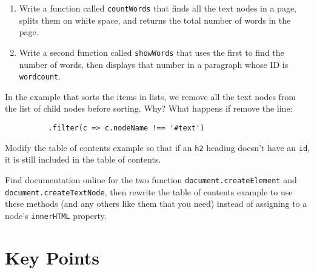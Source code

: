 
\begin{enumerate}
\item
  Write a function called \texttt{countWords} that finds all the text nodes in a page,
  splits them on white space,
  and returns the total number of words in the page.
\item
  Write a second function called \texttt{showWords} that uses the first to find the number of words,
  then displays that number in a paragraph whose ID is \texttt{wordcount}.
\end{enumerate}


In the example that sorts the items in lists,
we remove all the text nodes from the list of child nodes before sorting.
Why?
What happens if remove the line:

\begin{verbatim}
          .filter(c => c.nodeName !== '#text')
\end{verbatim}


Modify the table of contents example so that if an \texttt{h2} heading doesn't have an \texttt{id},
it is still included in the table of contents.


Find documentation online for the two function
\texttt{document.createElement} and \texttt{document.createTextNode},
then rewrite the table of contents example to use these methods
(and any others like them that you need)
instead of assigning to a node's \texttt{innerHTML} property.

\section*{Key Points}


